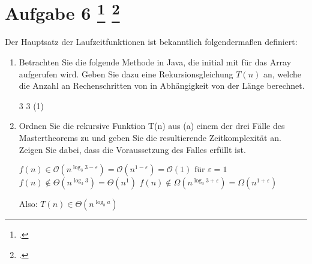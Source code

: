 \documentclass{lehramt-informatik-aufgabe}
\begin{document}

\section{Aufgabe 6 
\footcite[Seite 39 (PDF 26)]{aud:fs:2}
\footcite[Thema 2 Aufgabe 6]{examen:66115:2018:03}
}

Der Hauptsatz der Laufzeitfunktionen ist bekanntlich folgendermaßen definiert:

\liMasterExkurs

\begin{enumerate}

\item Betrachten Sie die folgende Methode  in Java, die
initial mit  für das Array 
aufgerufen wird. Geben Sie dazu eine Rekursionsgleichung $T(n)$ an,
welche die Anzahl an Rechenschritten von  in Abhängigkeit
von der Länge  berechnet.


\begin{liAntwort}
\liMasterVariablenDeklaration
{3} %
{3} %
{(1)} %
\end{liAntwort}


\item Ordnen Sie die rekursive Funktion T(n) aus (a) einem der drei
Fälle des Mastertheorems zu und geben Sie die resultierende
Zeitkomplexität an. Zeigen Sie dabei, dass die Voraussetzung des Falles
erfüllt ist.

\begin{liAntwort}

\liMasterFallRechnung
{$f(n) \in \mathcal{O}\left(n^{\log_{3}3-\varepsilon}\right) =
\mathcal{O}\left(n^{1-\varepsilon}\right) =
\mathcal{O}\left(1\right) \text{ für } \varepsilon = 1
$}
{$f(n) \notin \Theta \left(n^{{\log_{3}3}}\right) =
\Theta \left(n^1\right)
$}
{$f(n) \notin \Omega \left(n^{\log_{3}3 + \varepsilon}\right) =
\Omega \left(n^{1 + \varepsilon}\right)$}

Also: $T(n)\in \Theta \left(n^{\log_{b}a}\right)$

\end{liAntwort}
\end{enumerate}
\end{document}
